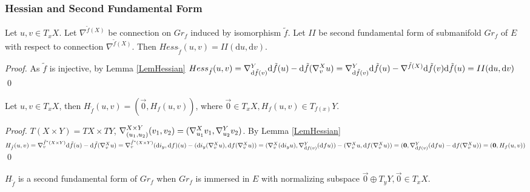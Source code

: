 \documentclass{llncs}
\newcommand{\CovariantDiffManif}[1]{\nabla^{#1}}
\newcommand{\CovariantDerivManif}[2]{\tensor*{\nabla}{^{#1}_{#2}}}
\newcommand{\Diff}{\mathrm{d}}
\newcommand {\Preimage}[2]{{#2}^*{#1}}
\begin{document}
\subsubsection{Hessian and Second Fundamental Form}

\begin{lemma}
Let $u, v \in T_xX$. Let $\CovariantDiffManif{\tilde{f}(X)}$ be connection on $Gr_f$ induced by isomorphism $\tilde{f}$. Let $II$ be second fundamental form of submanifold $Gr_f$ of $E$ with respect to connection $\CovariantDiffManif{\tilde{f}(X)}$. Then $Hess_{\tilde{f}}(u, v) = II(\Diff u, \Diff v)$.
\end{lemma}

\begin{proof}
As $\tilde{f}$ is injective, by Lemma \ref{LemHessian} $Hess_{\tilde{f}}(u, v) = 
						\CovariantDerivManif{Y} {\Diff \tilde{f}(v)} \Diff \tilde{f}(u) - 
							\Diff \tilde{f}(\CovariantDerivManif{X}{v}u ) = \CovariantDerivManif{Y} {\Diff \tilde{f}(v)} \Diff \tilde{f}(u) - 
							\CovariantDiffManif{\tilde{f}(X)}{\Diff \tilde{f}(v)}\Diff \tilde{f}(u) = II(\Diff u, \Diff v)$
\qed
\end{proof}

\begin{lemma}
Let $u, v \in T_xX$, 
then $H_{\tilde{f}}(u, v) = (\vec{0}, H_f(u, v))$,
where $\vec{0} \in T_xX, H_f(u, v) \in T_{f(x)}Y$.
\end{lemma}

\begin{proof}
$T(X\times Y)=TX\times TY$, $\CovariantDerivManif{X\times Y}{(u_1, u_2)}{(v_1, v_2)} = (\CovariantDerivManif{X}{u_1}{v_1}, \CovariantDerivManif{Y}{u_2}{v_2})$. 
By Lemma \ref{LemHessian} 
$H_{\tilde{f}}(u, v)=
\CovariantDerivManif{\Preimage{(X \times Y)}{\tilde{f}}} {v} \Diff \tilde{f}(u) - 
							\Diff \tilde{f}( 
							\CovariantDerivManif{X}{v}u
							) =
							\CovariantDerivManif{\Preimage{(X \times Y)}{\tilde{f}}}{v} (\Diff i_y, \Diff f)(u) - 
							(\Diff i_y( 
							\CovariantDerivManif{X}{v}u
							), \Diff f( 
							\CovariantDerivManif{X}{v}u
							)) =
							(\CovariantDerivManif{X}{v} (\Diff i_y u), \CovariantDerivManif{Y}{\Diff f(v)} (\Diff f u)) - 
							(\CovariantDerivManif{X}{v}u, \Diff f( 
							\CovariantDerivManif{X}{v}u)
							) =
							(\vec{0}, \CovariantDerivManif{Y}{\Diff f(v)} (\Diff f u) - \Diff f( 
							\CovariantDerivManif{X}{v}u)) =
							(\vec{0}, H_f(u, v))$
\qed 
\end{proof}

\begin{lemma}
$H_{\tilde{f}}$ is a second fundamental form of $Gr_f$ when $Gr_f$ is immersed in $E$ with normalizing subspace $\vec{0}\oplus T_yY, \vec{0} \in T_xX$.
\end{lemma}
\end{document}
